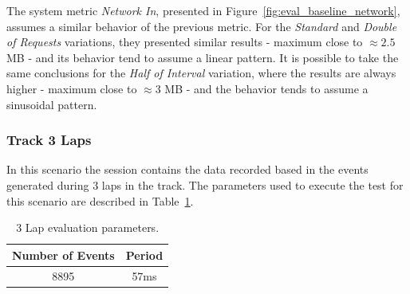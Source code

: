 The system metric \textit{Network In}, presented in Figure~\ref{fig:eval_baseline_network}, assumes a
similar behavior of the previous metric. For the \textit{Standard} and \textit{Double of Requests} variations,
they presented similar results - maximum close to $\approx2.5$ \gls{MB} - and its behavior tend to assume a linear
pattern. It is possible to take the same conclusions for the \textit{Half of Interval} variation,
where the results are always higher - maximum close to $\approx3$ \gls{MB} - and the behavior tends to assume
a sinusoidal pattern.

\subsubsection{Track 3 Laps}
\label{subs:eval_exp_data_3laps}
In this scenario the session contains the data recorded based in the events generated during 3 laps
in the track. The parameters used to execute the test for this scenario are described in
Table~\ref{tab:3laps_parameters}.\\

\begin{table}[ht!]
  \begin{tabular}{|c|c|}
    \hline
    Number of Events & Period \\ \hline
    8895             & 57ms   \\ \hline
  \end{tabular}
  \caption{3 Lap evaluation parameters.}
  \label{tab:3laps_parameters}
\end{table}

